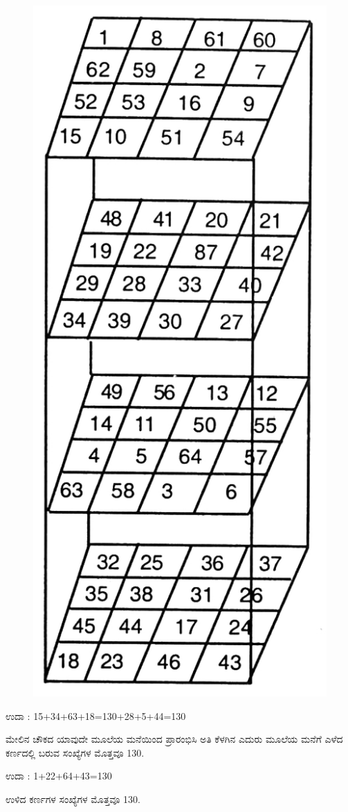 \begin{minipage}{4cm}
\begin{figure}[H]
\includegraphics{src/figures/chap8/fig8.11.jpg}
\end{figure}
\end{minipage}
\quad
\begin{minipage}{5.5cm}
ಉದಾ : 15+34+63+18=130+28+5+44=130

ಮೇಲಿನ ಚೌಕದ ಯಾವುದೇ ಮೂಲೆಯ ಮನೆಯಿಂದ ಪ್ರಾರಂಭಿಸಿ ಅತಿ ಕೆಳಗಿನ ಎದುರು ಮೂಲೆಯ ಮನೆಗೆ ಎಳೆದ ಕರ್ಣದಲ್ಲಿ ಬರುವ ಸಂಖ್ಯೆಗಳ ಮೊತ್ತವೂ 130.

ಉದಾ : 1+22+64+43=130

ಉಳಿದ ಕರ್ಣಗಳ ಸಂಖ್ಯೆಗಳ ಮೊತ್ತವೂ 130.
\end{minipage}

